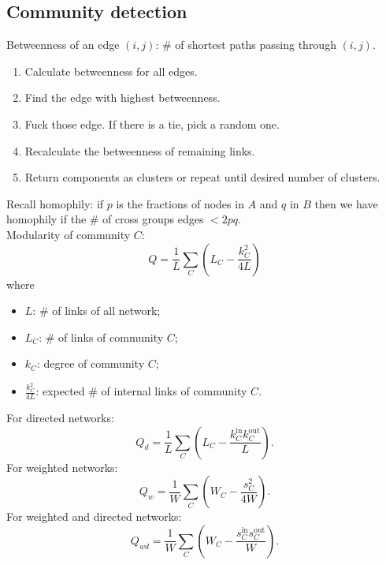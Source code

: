 \documentclass[a4paper,9pt]{extarticle}
\begin{document}
\begin{multicols*}{2}
		\subsection{Community detection}
		Betweenness of an edge $(i,j)$: \# of shortest paths passing through $(i,j)$.
		\begin{riquadro}
			\begin{enumerate}
				\item Calculate betweenness for all edges.
				\item Find the edge with highest betweenness. 
				\item Fuck those edge. If there is a tie, pick a random one.
				\item Recalculate the betweenness of remaining links.
				\item Return components as clusters or repeat until desired number of clusters.
			\end{enumerate}
		\end{riquadro}
		Recall homophily: if $p$ is the fractions of nodes in $A$ and $q$ in $B$ then we have homophily if the \# of cross groups edges $<2pq$. \\
		Modularity of community $C$:
		\begin{equation*}
			Q=\frac{1}{L}\sum_{C}\left(L_{C}-\frac{k^{2}_{C}}{4L}\right)
		\end{equation*} where
		\begin{itemize}
			\item $L$: \# of links of all network;
			\item $L_{C}$: \# of links of community $C$;
			\item $k_{C}$: degree of community $C$;
			\item $\frac{k^{2}_{C}}{4L}$: expected \# of internal links of community $C$.
		\end{itemize}
		For directed networks:
		\begin{equation*}
			Q_{d}=\frac{1}{L}\sum_{C}\left(L_{C}-\frac{k_{C}^{\mathrm{in}}k^{\mathrm{out}}_{C}}{L}\right).
		\end{equation*}
		For weighted networks:
		\begin{equation*}
			Q_{w}=\frac{1}{W}\sum_{C}\left(W_{C}-\frac{s^{2}_{C}}{4W}\right).
		\end{equation*}
		For weighted and directed networks:
		\begin{equation*}
			Q_{wd}=\frac{1}{W}\sum_{C}\left(W_{C}-\frac{s^{\mathrm{in}}_{C}s^{\mathrm{out}}_{C}}{W}\right).
		\end{equation*}

\end{multicols*}
\end{document}
